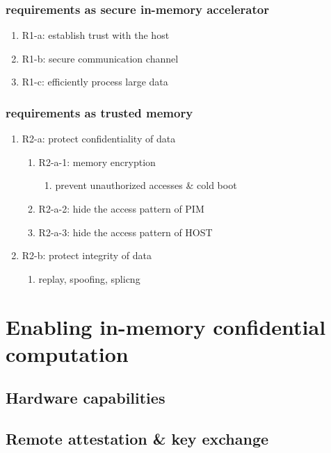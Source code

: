\documentclass[11pt]{article}
\begin{document}
\subsubsection{requirements as secure in-memory accelerator}
\label{sec:org6abda3e}
\begin{enumerate}
\item R1-a: establish trust with the host
\label{sec:org8bf95a8}
\item R1-b: secure communication channel
\label{sec:orge6604d1}
\item R1-c: efficiently process large data
\label{sec:orgd0ee7ff}
\end{enumerate}
\subsubsection{requirements as trusted memory}
\label{sec:org8818db9}
\begin{enumerate}
\item R2-a: protect confidentiality of data
\label{sec:org1c16471}
\begin{enumerate}
\item R2-a-1: memory encryption
\label{sec:org239abac}
\begin{enumerate}
\item prevent unauthorized accesses \& cold boot
\label{sec:org3944a04}
\end{enumerate}
\item R2-a-2: hide the access pattern of PIM
\label{sec:orgc3fa038}
\item R2-a-3: hide the access pattern of HOST
\label{sec:org8ea25fa}
\end{enumerate}
\item R2-b: protect integrity of data
\label{sec:orgc417487}
\begin{enumerate}
\item replay, spoofing, splicng
\label{sec:org5b5443c}
\end{enumerate}
\end{enumerate}
\section{Enabling in-memory confidential computation}
\label{sec:org0ad53d3}
\subsection{Hardware capabilities}
\label{sec:orgd3256c8}
\subsection{Remote attestation \& key exchange}
\label{sec:orgac00635}
\end{document}
